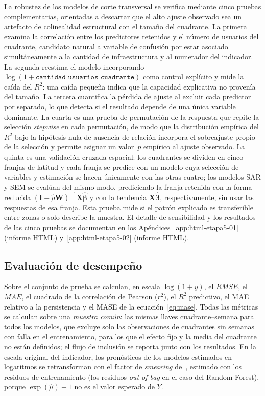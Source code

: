 La robustez de los modelos de corte transversal se verifica mediante cinco pruebas complementarias, orientadas a descartar que el alto ajuste observado sea un artefacto de colinealidad estructural con el tamaño del cuadrante. La primera examina la correlación entre los predictores retenidos y el número de usuarios del cuadrante, candidato natural a variable de confusión por estar asociado simultáneamente a la cantidad de infraestructura y al numerador del indicador. La segunda reestima el modelo incorporando $\log(1+\texttt{cantidad\_usuarios\_cuadrante})$ como control explícito y mide la caída del $R^2$: una caída pequeña indica que la capacidad explicativa no provenía del tamaño. La tercera cuantifica la pérdida de ajuste al excluir cada predictor por separado, lo que detecta si el resultado depende de una única variable dominante. La cuarta es una prueba de permutación de la respuesta que repite la selección \emph{stepwise} en cada permutación, de modo que la distribución empírica del $R^2$ bajo la hipótesis nula de ausencia de relación incorpora el sobreajuste propio de la selección y permite asignar un valor~$p$ empírico al ajuste observado. La quinta es una validación cruzada espacial: los cuadrantes se dividen en cinco franjas de latitud y cada franja se predice con un modelo cuya selección de variables y estimación se hacen únicamente con las otras cuatro; los modelos SAR y SEM se evalúan del mismo modo, prediciendo la franja retenida con la forma reducida $(\mathbf{I}-\hat\rho\mathbf{W})^{-1}\mathbf{X}\hat{\boldsymbol\beta}$ y con la tendencia $\mathbf{X}\hat{\boldsymbol\beta}$, respectivamente, sin usar las respuestas de esa franja. Esta prueba mide si el patrón explicado es transferible entre zonas o solo describe la muestra. El detalle de sensibilidad y los resultados de las cinco pruebas se documentan en los Apéndices~\ref{app:html-etapa5-01} (\href{\urlEtapaCincoUno}{informe HTML}) y~\ref{app:html-etapa5-02} (\href{\urlEtapaCincoDos}{informe HTML}).

\subsection{Evaluación de desempeño}
\label{sec:evaluacion_desempeno}
Sobre el conjunto de prueba se calculan, en escala $\log(1+y)$, el $RMSE$, el $MAE$, el cuadrado de la correlación de Pearson ($r^2$), el $R^2$ predictivo, el MAE relativo a la persistencia y el MASE de la ecuación~\eqref{eq:mase}. Todas las métricas se calculan sobre una \emph{muestra común}: las mismas llaves cuadrante--semana para todos los modelos, que excluye solo las observaciones de cuadrantes sin semanas con falla en el entrenamiento, para los que el efecto fijo y la media del cuadrante no están definidos; el flujo de inclusión se reporta junto con los resultados. En la escala original del indicador, los pronósticos de los modelos estimados en logaritmos se retransforman con el factor de \emph{smearing} de~\cite{duan1983}, estimado con los residuos de entrenamiento (los residuos \emph{out-of-bag} en el caso del Random Forest), porque $\exp(\hat\mu)-1$ no es el valor esperado de $Y$.

